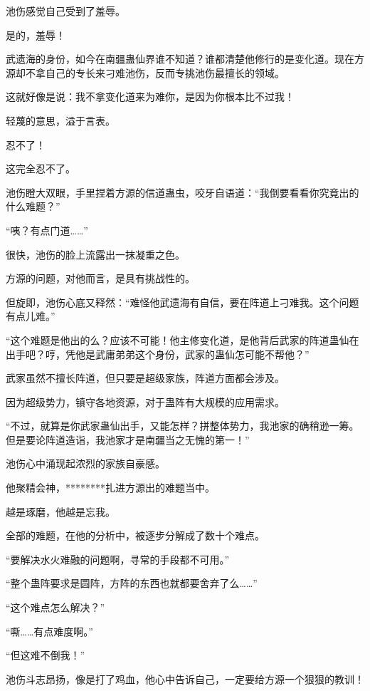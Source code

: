 
\begin{this_body}

池伤感觉自己受到了羞辱。

是的，羞辱！

武遗海的身份，如今在南疆蛊仙界谁不知道？谁都清楚他修行的是变化道。现在方源却不拿自己的专长来刁难池伤，反而专挑池伤最擅长的领域。

这就好像是说：我不拿变化道来为难你，是因为你根本比不过我！

轻蔑的意思，溢于言表。

忍不了！

这完全忍不了。

池伤瞪大双眼，手里捏着方源的信道蛊虫，咬牙自语道：“我倒要看看你究竟出的什么难题？”

“咦？有点门道……”

很快，池伤的脸上流露出一抹凝重之色。

方源的问题，对他而言，是具有挑战性的。

但旋即，池伤心底又释然：“难怪他武遗海有自信，要在阵道上刁难我。这个问题有点儿难。”

“这个难题是他出的么？应该不可能！他主修变化道，是他背后武家的阵道蛊仙在出手吧？哼，凭他是武庸弟弟这个身份，武家的蛊仙怎可能不帮他？”

武家虽然不擅长阵道，但只要是超级家族，阵道方面都会涉及。

因为超级势力，镇守各地资源，对于蛊阵有大规模的应用需求。

“不过，就算是你武家蛊仙出手，又能怎样？拼整体势力，我池家的确稍逊一筹。但是要论阵道造诣，我池家才是南疆当之无愧的第一！”

池伤心中涌现起浓烈的家族自豪感。

他聚精会神，********扎进方源出的难题当中。

越是琢磨，他越是忘我。

全部的难题，在他的分析中，被逐步分解成了数十个难点。

“要解决水火难融的问题啊，寻常的手段都不可用。”

“整个蛊阵要求是圆阵，方阵的东西也就都要舍弃了么……”

“这个难点怎么解决？”

“嘶……有点难度啊。”

“但这难不倒我！”

池伤斗志昂扬，像是打了鸡血，他心中告诉自己，一定要给方源一个狠狠的教训！


\end{this_body}
